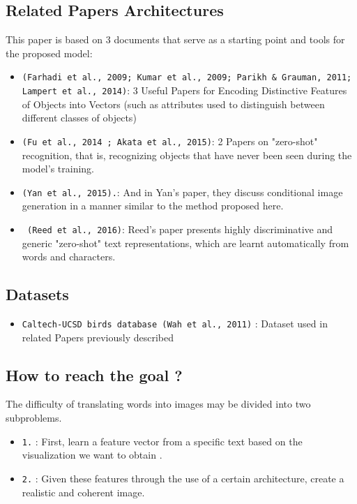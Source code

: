 \subsection*{Related Papers Architectures}
 This paper is based on 3 documents that serve as a starting 
 point and tools for the proposed model:
 \begin{itemize}[noitemsep]
    \item \texttt{(Farhadi et al., 2009; Kumar et al., 2009;
    Parikh \& Grauman, 2011; Lampert et al., 2014)}: 
    3 Useful Papers for Encoding Distinctive Features of Objects 
    into Vectors (such as attributes used to distinguish 
    between different classes of objects)
    \item \texttt{(Fu et al., 2014 ; Akata et al., 2015)}: 
    2 Papers on "zero-shot" recognition, that is, recognizing 
    objects that have never been seen during the model's training.
    \item \texttt{(Yan et al., 2015).}: 
    And in Yan's paper, they discuss conditional image generation 
    in a manner similar to the method proposed here.
    \item \texttt{ (Reed et al., 2016)}: 
    Reed's paper presents highly discriminative and generic
    "zero-shot" text representations, 
    which are learnt automatically from words and characters.
\end{itemize}

\subsection*{Datasets}

\begin{itemize}[noitemsep]
    \item \texttt{Caltech-UCSD birds database (Wah et al., 2011)} : 
    Dataset used in related Papers previously described 
\end{itemize}

\subsection*{How to reach the goal ?}
The difficulty of translating words into images may be 
divided into two subproblems.
\begin{itemize}[noitemsep]
    \item \texttt{1.} : 
    First, learn a feature vector from a specific text 
    based on the visualization we want to obtain .
    \item \texttt{2.} : 
    Given these features through the use of a certain architecture, 
    create a realistic and coherent image.
\end{itemize}